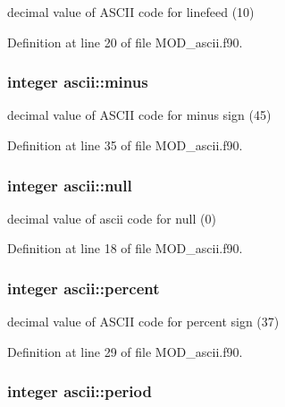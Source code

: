 decimal value of A\-S\-C\-I\-I code for linefeed (10) 



Definition at line 20 of file M\-O\-D\-\_\-ascii.\-f90.

\hypertarget{classascii_a0c61e89c207d71b8fbd48e8b052e1154}{
\subsubsection[{minus}]{\setlength{\rightskip}{0pt plus 5cm}integer ascii\-::minus}}\label{classascii_a0c61e89c207d71b8fbd48e8b052e1154}


decimal value of A\-S\-C\-I\-I code for minus sign (45) 



Definition at line 35 of file M\-O\-D\-\_\-ascii.\-f90.

\hypertarget{classascii_a2805145f9891f7cb95a0c2310890272a}{
\subsubsection[{null}]{\setlength{\rightskip}{0pt plus 5cm}integer ascii\-::null}}\label{classascii_a2805145f9891f7cb95a0c2310890272a}


decimal value of ascii code for null (0) 



Definition at line 18 of file M\-O\-D\-\_\-ascii.\-f90.

\hypertarget{classascii_a9e2bfb6070304c20dd4ea1efc8ebdf2c}{
\subsubsection[{percent}]{\setlength{\rightskip}{0pt plus 5cm}integer ascii\-::percent}}\label{classascii_a9e2bfb6070304c20dd4ea1efc8ebdf2c}


decimal value of A\-S\-C\-I\-I code for percent sign (37) 



Definition at line 29 of file M\-O\-D\-\_\-ascii.\-f90.

\hypertarget{classascii_a7ab33aecf120d4c5c71c444ae16423f0}{
\subsubsection[{period}]{\setlength{\rightskip}{0pt plus 5cm}integer ascii\-::period}}\label{classascii_a7ab33aecf120d4c5c71c444ae16423f0}


